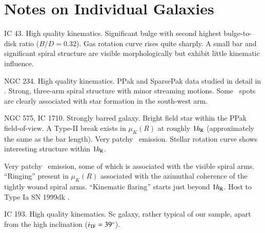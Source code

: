 \documentclass[traditabstract]{aa} %
\begin{document}
\setlength{\bibsep}{1.3pt}


\appendix


\section{Notes on Individual Galaxies}
\label{app:gal}

\begin{list}{}
%
  {
%
  \settowidth{\labelwidth}{\bf UGC 00000:}
%
  \setlength{\labelsep}{1em}
%
  \setlength{\itemsep}{0.2em}
%
  \setlength{\parskip}{0.2em}
%
  \setlength{\leftmargin}{\labelwidth}
%
  \setlength{\rightmargin}{0pt}
%
  }
%
  \item[{\bf UGC   448:}] IC 43.  High quality kinematics.  Significant bulge
  with second highest bulge-to-disk ratio ($B/D = 0.32$).  Gas rotation curve
  rises quite sharply.  A small bar and significant spiral structure are visible
  morphologically but exhibit little kinematic influence.
%
  \item[{\bf UGC   463:}] NGC 234.  High quality kinematics.  PPak and SparsePak
  data studied in detail in .  Strong, three-arm
  spiral structure with minor streaming motions.  Some \oiii\ spots are clearly
  associated with star formation in the south-west arm.
%
  \item[{\bf UGC  1081:}] NGC 575, IC 1710. Strongly barred galaxy. Bright field star
  within the PPak field-of-view.  A Type-II break exists in $\mu_K(R)$ at roughly
  $1h_{\rm R}$ (approximately the same as the bar length). Very patchy \oiii\ emission.
  Stellar rotation curve shows interesting structure within $1h_{\rm R}$.
%
  \item[{\bf UGC  1087:}] Very patchy \oiii\ emission, some of which is
  associated with the visible spiral arms.  ``Ringing'' present in $\mu_K(R)$
  associated with the azimuthal coherence of the tightly wound spiral arms.
  ``Kinematic flaring'' starts just beyond $1h_{\rm R}$.  Host to Type Ia SN 1999dk
  \citep{modjaz1999}.
%
  \item[{\bf UGC  1529:}] IC 193.  High quality kinematics.  Sc galaxy, rather
  typical of our sample, apart from the high inclination ($i_{\rm TF}=39\mbox{$^\circ$}$).

\end{list}
\end{document}
